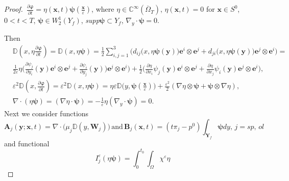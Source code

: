 \documentclass{article}
\theoremstyle{plain}
\theoremstyle{definition}
\numberwithin{equation}{section}
\begin{document}
\begin{proof}
$\displaystyle\,\frac{\partial\boldsymbol{\varphi}}{\partial{t}}=
\eta(\boldsymbol{x},t)\boldsymbol{\psi}(\frac{\boldsymbol{x}}{\varepsilon})$, where
$\eta\in\mathbb{C}^{\infty}(\overline{\Omega}_{T})$, $\eta(\boldsymbol{x},t)=0$ for $\boldsymbol{x}\in{S}^{0}$, $0<t<T$, $\boldsymbol{\psi}\in{W}^{1}_{2}(Y_{f})$,
\emph{supp}$\boldsymbol{\psi}\subset{Y}_{f}$, $\nabla_{y}\cdot\boldsymbol{\psi}=0$.

Then
\begin{equation*}
\begin{aligned}
& 
\mathbb{D}(x,{\eta}\frac{\partial\boldsymbol{\varphi}}{\partial{t}})=
\mathbb{D}(x,{\eta}\boldsymbol{\psi})=\frac{1}{2}\sum_{i,j=1}^{3}\Big({d}_{ij}\big(x,{\eta}
\boldsymbol{\psi}(\boldsymbol{y})\big)\boldsymbol{e}^{i}\otimes\boldsymbol{e}^{j}+
{d}_{ji}(x,{\eta}\boldsymbol{\psi}(\boldsymbol{y})\big)\boldsymbol{e}^{j}\otimes\boldsymbol{e}^{i}\Big)=
\\
& \frac{1}{2\varepsilon}{\eta}\big(\frac{\partial{\psi}_{j}}{\partial{y}_{i}}(\boldsymbol{y})
\boldsymbol{e}^{i}\otimes\boldsymbol{e}^{j}+\frac{\partial{\psi}_{i}}{\partial{y}_{j}}(\boldsymbol{y})\big)
\boldsymbol{e}^{j}\otimes\boldsymbol{e}^{i}\big)+
\frac{1}{2}\big(\frac{\partial{\eta}}{\partial{x}_{i}}{\psi}_{j}(\boldsymbol{y})
\boldsymbol{e}^{i}\otimes\boldsymbol{e}^{j}+
\frac{\partial{\eta}}{\partial{x}_{j}}{\psi}_{i}(\boldsymbol{y})
\boldsymbol{e}^{j}\otimes\boldsymbol{e}^{i}\big),
\\
& \varepsilon^{2}\mathbb{D}(x,\frac{\partial\boldsymbol{\varphi}}{\partial{t}})=
\varepsilon^{2}\mathbb{D}(x,{\eta}\boldsymbol{\psi})=
\eta\varepsilon\mathbb{D}\big(y,\boldsymbol{\psi}(\frac{\boldsymbol{x}}{\varepsilon})\big)+
\frac{\varepsilon^{2}}{2}(\nabla{\eta}\otimes\boldsymbol{\psi}+
\boldsymbol{\psi}\otimes\nabla{\eta}),
\\
& \nabla\cdot(\eta\boldsymbol{\psi})=
(\nabla{\eta}\cdot\boldsymbol{\psi})=-\frac{1}{\varepsilon}\eta(\nabla_{y}\cdot\boldsymbol{\psi})=0.
\end{aligned}
\end{equation*}
Next we consider functions
\begin{equation}\label{eq5.9}
\boldsymbol{A}_{j}(\boldsymbol{y};\boldsymbol{x},t)=
\nabla\cdot\big(\mu_{j}\mathbb{D}(y,\boldsymbol{W}_{j})\big)\,
\mbox{and}\,\boldsymbol{B}_{j}(\boldsymbol{x},t)=
(t\pi_{j}-{p}^{0})\int_{\textbf{Y}_{f}}\boldsymbol{\psi}dy,\,j=sp,\,ol
\end{equation}
and functional
\begin{equation*}
I^{\varepsilon}_{j}(\eta\boldsymbol{\psi})=\int_{0}^{t_{0}}\int_{\Omega}\chi^{\varepsilon}\eta

\end{equation*}
\end{proof}
\end{document}
